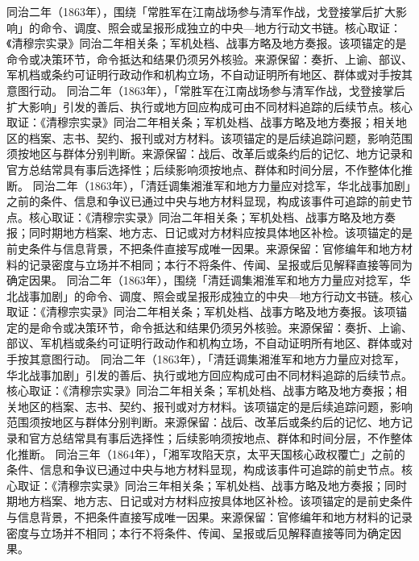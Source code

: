 同治二年（1863年），围绕「常胜军在江南战场参与清军作战，戈登接掌后扩大影响」的命令、调度、照会或呈报形成独立的中央—地方行动文书链。核心取证：《清穆宗实录》同治二年相关条；军机处档、战事方略及地方奏报。该项锚定的是命令或决策环节，命令抵达和结果仍须另外核验。来源保留：奏折、上谕、部议、军机档或条约可证明行政动作和机构立场，不自动证明所有地区、群体或对手按其意图行动。
同治二年（1863年），「常胜军在江南战场参与清军作战，戈登接掌后扩大影响」引发的善后、执行或地方回应构成可由不同材料追踪的后续节点。核心取证：《清穆宗实录》同治二年相关条；军机处档、战事方略及地方奏报；相关地区的档案、志书、契约、报刊或对方材料。该项锚定的是后续追踪问题，影响范围须按地区与群体分别判断。来源保留：战后、改革后或条约后的记忆、地方记录和官方总结常具有事后选择性；后续影响须按地点、群体和时间分层，不作整体化推断。
同治二年（1863年），「清廷调集湘淮军和地方力量应对捻军，华北战事加剧」之前的条件、信息和争议已通过中央与地方材料显现，构成该事件可追踪的前史节点。核心取证：《清穆宗实录》同治二年相关条；军机处档、战事方略及地方奏报；同时期地方档案、地方志、日记或对方材料应按具体地区补检。该项锚定的是前史条件与信息背景，不把条件直接写成唯一因果。来源保留：官修编年和地方材料的记录密度与立场并不相同；本行不将条件、传闻、呈报或后见解释直接等同为确定因果。
同治二年（1863年），围绕「清廷调集湘淮军和地方力量应对捻军，华北战事加剧」的命令、调度、照会或呈报形成独立的中央—地方行动文书链。核心取证：《清穆宗实录》同治二年相关条；军机处档、战事方略及地方奏报。该项锚定的是命令或决策环节，命令抵达和结果仍须另外核验。来源保留：奏折、上谕、部议、军机档或条约可证明行政动作和机构立场，不自动证明所有地区、群体或对手按其意图行动。
同治二年（1863年），「清廷调集湘淮军和地方力量应对捻军，华北战事加剧」引发的善后、执行或地方回应构成可由不同材料追踪的后续节点。核心取证：《清穆宗实录》同治二年相关条；军机处档、战事方略及地方奏报；相关地区的档案、志书、契约、报刊或对方材料。该项锚定的是后续追踪问题，影响范围须按地区与群体分别判断。来源保留：战后、改革后或条约后的记忆、地方记录和官方总结常具有事后选择性；后续影响须按地点、群体和时间分层，不作整体化推断。
同治三年（1864年），「湘军攻陷天京，太平天国核心政权覆亡」之前的条件、信息和争议已通过中央与地方材料显现，构成该事件可追踪的前史节点。核心取证：《清穆宗实录》同治三年相关条；军机处档、战事方略及地方奏报；同时期地方档案、地方志、日记或对方材料应按具体地区补检。该项锚定的是前史条件与信息背景，不把条件直接写成唯一因果。来源保留：官修编年和地方材料的记录密度与立场并不相同；本行不将条件、传闻、呈报或后见解释直接等同为确定因果。
